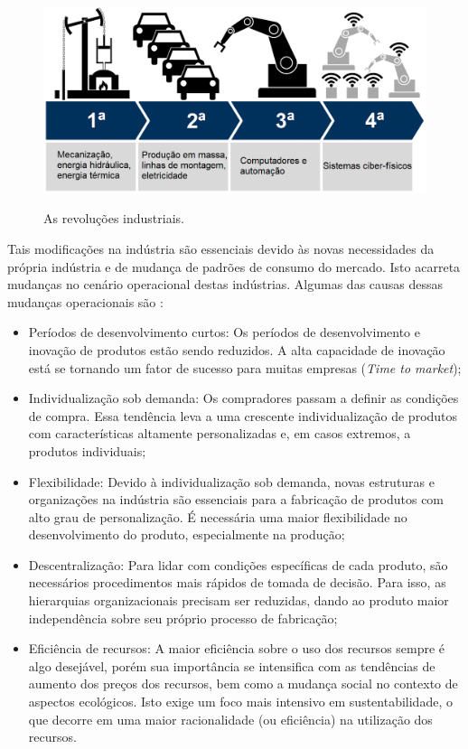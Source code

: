 \documentclass[
	12pt,				%
	oneside,			%
	a4paper,			%
	english,			%
	brazil				%
]{abntex2}
\begin{document}
	\begin{figure}[H]
		\centering
		\caption{As revoluções industriais.}
		\includegraphics[width=1\textwidth]{i4.png}
		\label{fig:i4}
	\end{figure}

	Tais modificações na indústria são essenciais devido às novas necessidades da própria indústria e de mudança de padrões de consumo do mercado. Isto acarreta mudanças no cenário operacional destas indústrias. Algumas das causas dessas mudanças operacionais são \cite{lasi2014industryfour}:
	
	\begin{itemize}

		\item Períodos de desenvolvimento curtos: Os períodos de desenvolvimento e inovação de produtos estão sendo reduzidos. A alta capacidade de inovação está se tornando um fator de sucesso para muitas empresas (\textit{Time to market});
		
		\item Individualização sob demanda: Os compradores passam a definir as condições de compra. Essa tendência leva a uma crescente individualização de produtos com características altamente personalizadas e, em casos extremos, a produtos individuais;
		
		\item Flexibilidade: Devido à individualização sob demanda, novas estruturas e organizações na indústria são essenciais para a fabricação de produtos com alto grau de personalização. É necessária uma maior flexibilidade no desenvolvimento do produto, especialmente na produção;
		
		\item Descentralização: Para lidar com condições específicas de cada produto, são necessários procedimentos mais rápidos de tomada de decisão. Para isso, as hierarquias organizacionais precisam ser reduzidas, dando ao produto maior independência sobre seu próprio processo de fabricação;
		
		\item Eficiência de recursos: A maior eficiência sobre o uso dos recursos sempre é algo desejável, porém sua importância se intensifica com as tendências de aumento dos preços dos recursos, bem como a mudança social no contexto de aspectos ecológicos. Isto exige um foco mais intensivo em sustentabilidade, o que decorre em uma maior racionalidade (ou eficiência) na utilização dos recursos.

	\end{itemize}
\end{document}
